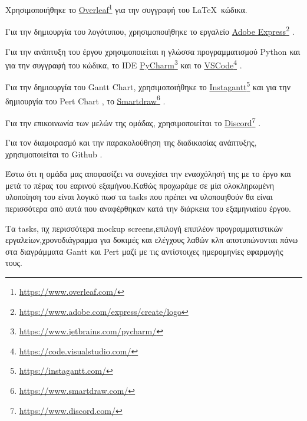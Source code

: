 \documentclass{../ol-softwaremanual}
\newcommand{\doclink}[2]{\href{#1}{#2}\footnote{\url{#1}}}
\begin{document}
\vspace{20pt}


\vspace{20pt}
\flushleft
Χρησιμοποιήθηκε το \en \doclink{https://www.overleaf.com/}{Overleaf} \gr για την συγγραφή του \LaTeX\ κώδικα. \break

Για την δημιουργία του λογότυπου, χρησιμοποιήθηκε το εργαλείο \en \doclink{https://www.adobe.com/express/create/logo}{Adobe Express} . \gr \break

Για την ανάπτυξη του έργου χρησιμοποιείται η γλώσσα προγραμματισμού \en Python \gr και για την συγγραφή του κώδικα, το \en IDE \doclink{https://www.jetbrains.com/pycharm/}{PyCharm} \gr και το \en \doclink{https://code.visualstudio.com/}{VSCode} \gr .         \\ \break

Για την δημιουργία του \en Gantt Chart, \gr χρησιμοποιήθηκε το \en \doclink{https://instagantt.com/}{Instagantt} \gr και για την δημιουργία του \en Pert Chart \gr, το \en \doclink{https://www.smartdraw.com/}{Smartdraw} \gr. \break 

Για την επικοινωνία των μελών της ομάδας, χρησιμοποιείται το \en \doclink{ https://www.discord.com/}{Discord} \gr . \linebreak 


Για τον διαμοιρασμό και την παρακολούθηση της διαδικασίας ανάπτυξης, χρησιμοποιείται το \en Github \gr.



\newpage

\flushleft

\vspace{20pt}

Έστω ότι η ομάδα μας αποφασίζει να συνεχίσει την ενασχόλησή της με το έργο και μετά το πέρας του εαρινού εξαμήνου.Καθώς προχωράμε σε μία ολοκληρωμένη υλοποίηση του είναι λογικό πωσ τα \en tasks \gr που πρέπει να υλοποιηθούν θα είναι περισσότερα από αυτά που αναφέρθηκαν κατά την διάρκεια του εξαμηνιαίου έργου.

\vspace{20pt}

Τα \en tasks, \gr πχ περισσότερα \en mockup screens\gr,επιλογή επιπλέον προγραμματιστικών εργαλείων,χρονοδιάγραμμα για δοκιμές και ελέγχους λαθών κλπ αποτυπώνονται πάνω στα διαγράμματα \en Gantt \gr και \en Pert \gr μαζί με τις αντίστοιχες ημερομηνίες εφαρμογής τους.
\vspace{5pt}
\end{document}
